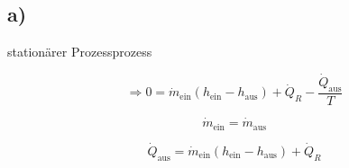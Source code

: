 

\subsection*{a)}
stationärer Prozessprozess

\[
\Rightarrow 0 = \dot{m}_{\text{ein}} (h_{\text{ein}} - h_{\text{aus}}) + \dot{Q}_R - \frac{\dot{Q}_{\text{aus}}}{T}
\]

\[
\dot{m}_{\text{ein}} = \dot{m}_{\text{aus}}
\]

\[
\dot{Q}_{\text{aus}} = \dot{m}_{\text{ein}} (h_{\text{ein}} - h_{\text{aus}}) + \dot{Q}_R
\]